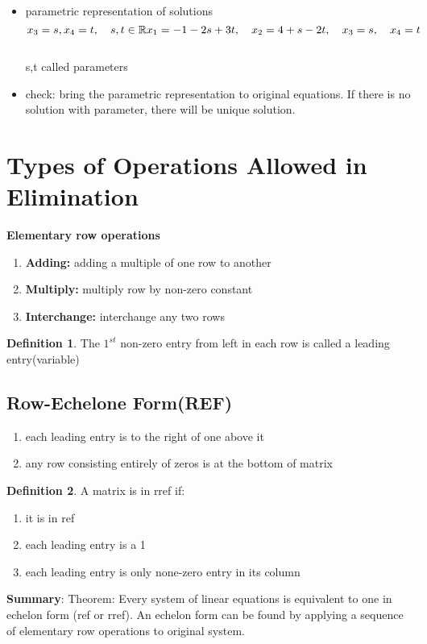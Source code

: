 \documentclass{article}
\theoremstyle{definition}
\newtheorem{definition}{Definition}[section]
\theoremstyle{thrm}
\begin{document}
\begin{itemize}
	\item parametric representation of solutions
	\begin{equation*}
	x_3 = s, x_4 = t, \quad s,t \in \mathbb{R}\\
	x_1 = -1-2s+3t,\quad x_2 = 4+s-2t,\quad x_3 = s,\quad x_4=t
	\end{equation*}\\
	s,t called parameters
	\item check: bring the parametric representation to original equations. If there is no solution with parameter, there will be unique solution.
\end{itemize}

\pagebreak
\section{Types of Operations Allowed in Elimination}
\textbf{Elementary row operations}
\begin{enumerate}
	\item \textbf{Adding:} adding a multiple of one row to another
	\item \textbf{Multiply:}	 multiply row by non-zero constant
	\item \textbf{Interchange:} interchange any two rows
\end{enumerate}
\begin{definition}
	The $1^{st}$ non-zero entry from left in each row is called a leading entry(variable)
\end{definition}
\subsection{Row-Echelone Form(REF)}
\begin{enumerate}
	\item each leading entry is to the right of one above it
	\item any row consisting entirely of zeros is at the bottom of matrix
\end{enumerate}
\begin{definition}
	A matrix is in rref if:
	\begin{enumerate}
		\item it is in ref
		\item each leading entry is a 1
		\item each leading entry is only none-zero entry in its column
	\end{enumerate}
\end{definition}
\textbf{Summary}: Theorem: Every system of linear equations is equivalent to one in echelon form (ref or rref). An echelon form can be found by applying a sequence of elementary row operations to original system.
\pagebreak
\end{document}

